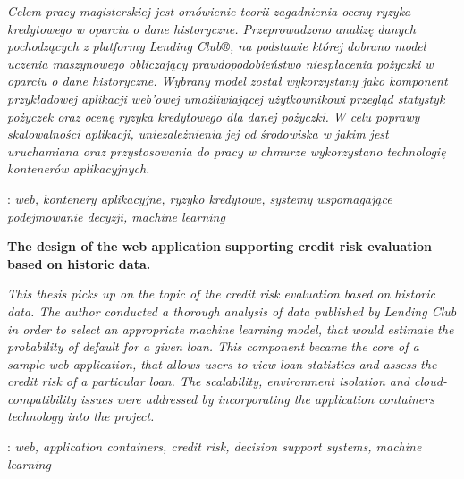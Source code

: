 \begin{titlepage}
{\itshape
Celem pracy magisterskiej jest omówienie teorii zagadnienia oceny ryzyka kredytowego w oparciu o dane historyczne. Przeprowadzono analizę danych pochodzących z platformy Lending Club®, na podstawie której dobrano model uczenia maszynowego obliczający prawdopodobieństwo niespłacenia pożyczki w oparciu o dane historyczne. Wybrany model został wykorzystany jako komponent przykładowej aplikacji web'owej umożliwiającej użytkownikowi przegląd statystyk pożyczek oraz ocenę ryzyka kredytowego dla danej pożyczki. W celu poprawy skalowalności aplikacji, uniezależnienia jej od środowiska w jakim jest uruchamiana oraz przystosowania do pracy w chmurze wykorzystano technologię kontenerów aplikacyjnych. 
}
\vspace*{1\baselineskip}

: {\itshape web, kontenery aplikacyjne, ryzyko kredytowe, systemy wspomagające podejmowanie decyzji, machine learning}
\par
\vspace{4\baselineskip}
\begin{center}
	{\large\bfseries The design of the web application supporting credit risk evaluation based on historic data.}\par\bigskip
\end{center}

{\itshape
This thesis picks up on the topic of the credit risk evaluation based on historic data. The author conducted a thorough analysis of data published by Lending Club in order to select an appropriate machine learning model, that would estimate the probability of default for a given loan. This component became the core of a sample web application, that allows users to view loan statistics and assess the credit risk of a particular loan. The scalability, environment isolation and cloud-compatibility issues were addressed by incorporating the application containers technology into the project.}
\vspace*{1\baselineskip}

: {\itshape web, application containers, credit risk, decision support systems, machine learning}

\end{titlepage}